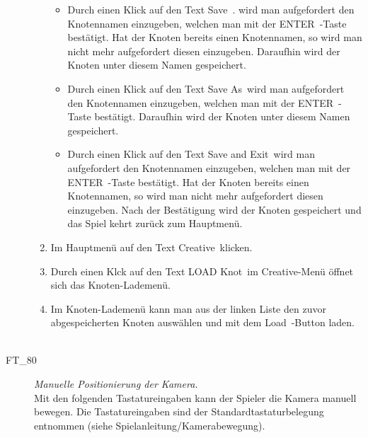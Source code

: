 \begin{description}
\begin{enumerate}
		\begin{itemize} 
		
        \item Durch einen Klick auf den Text \glqq Save\grqq~. wird man aufgefordert den Knotennamen einzugeben, welchen man mit der \glqq ENTER\grqq~-Taste bestätigt. Hat der Knoten bereits einen Knotennamen, so wird man nicht mehr aufgefordert diesen einzugeben. Daraufhin wird der Knoten unter diesem Namen gespeichert.
        
        \item Durch einen Klick auf den Text \glqq Save As\grqq~wird man aufgefordert den Knotennamen einzugeben, welchen man mit der \glqq ENTER\grqq~-Taste bestätigt. Daraufhin wird der Knoten unter diesem Namen gespeichert.
        
        \item Durch einen Klick auf den Text \glqq Save and Exit\grqq~wird man aufgefordert den Knotennamen einzugeben, welchen man mit der \glqq ENTER\grqq~-Taste bestätigt. Hat der Knoten bereits einen Knotennamen, so wird man nicht mehr aufgefordert diesen einzugeben. Nach der Bestätigung wird der Knoten gespeichert und das Spiel kehrt zurück zum Hauptmenü.	
		
		\end{itemize}
		
		\item Im Hauptmenü auf den Text \glqq Creative\grqq~klicken.
		
		\item Durch einen Klck auf den Text \glqq LOAD Knot\grqq~im Creative-Menü öffnet sich das Knoten-Lademenü.
		
		\item Im Knoten-Lademenü kann man aus der linken Liste den zuvor abgespeicherten Knoten auswählen und mit dem \glqq Load\grqq~-Button laden.
		~\\
		
	\end{enumerate}
	
	

\label{FT:80}
	
	\item[FT\_80] \textit{Manuelle Positionierung der Kamera.} \hfill\\
	
	Mit den folgenden Tastatureingaben kann der Spieler die Kamera manuell bewegen. Die Tastatureingaben sind der Standardtastaturbelegung entnommen (siehe Spielanleitung/Kamerabewegung).
	

\end{description}
